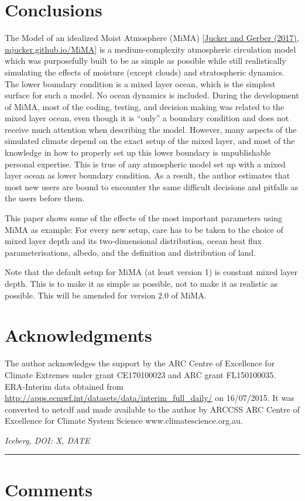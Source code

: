 \section{Conclusions}\label{conclusions}

The Model of an idealized Moist Atmosphere (MiMA)
{[}\href{http://journals.ametsoc.org/doi/10.1175/JCLI-D-17-0127.1}{Jucker
and Gerber (2017)},
\href{http://mjucker.github.io/MiMA}{mjucker.github.io/MiMA}{]} is a
medium-complexity atmospheric circulation model which was purposefully
built to be as simple as possible while still realistically simulating
the effects of moisture (except clouds) and stratospheric dynamics. The
lower boundary condition is a mixed layer ocean, which is the simplest
surface for such a model. No ocean dynamics is included. During the
development of MiMA, most of the coding, testing, and decision making
was related to the mixed layer ocean, even though it is ``only'' a
boundary condition and does not receive much attention when describing
the model. However, many aspects of the simulated climate depend on the
exact setup of the mixed layer, and most of the knowledge in how to
properly set up this lower boundary is unpublishable personal expertise.
This is true of any atmospheric model set up with a mixed layer ocean as
lower boundary condition. As a result, the author estimates that most
new users are bound to encounter the same difficult decisions and
pitfalls as the users before them.

This paper shows some of the effects of the most important parameters
using MiMA as example: For every new setup, care has to be taken to the
choice of mixed layer depth and its two-dimensional distribution, ocean
heat flux parameterisations, albedo, and the definition and distribution
of land.

Note that the default setup for MiMA (at least version 1) is constant
mixed layer depth. This is to make it as simple as possible, not to make
it as realistic as possible. This will be amended for version 2.0 of
MiMA.

\section{Acknowledgments}\label{acknowledgments}

The author acknowledges the support by the ARC Centre of Excellence for
Climate Extremes under grant CE170100023 and ARC grant FL150100035.\\
ERA-Interim data obtained from
\url{http://apps.ecmwf.int/datasets/data/interim_full_daily/} on
16/07/2015. It was converted to netcdf and made available to the author
by ARCCSS ARC Centre of Excellence for Climate System Science
www.climatescience.org.au.

\emph{Iceberg, DOI: X, DATE}

\begin{center}\rule{0.5\linewidth}{\linethickness}\end{center}

\section{Comments}\label{comments}
